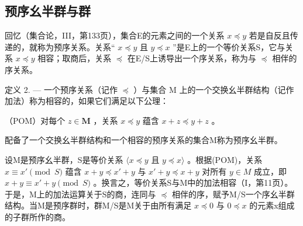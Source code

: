 \subsection{预序幺半群与群}

回忆（集合论，III，第133页），集合E的元素之间的一个关系 \(x \preccurlyeq y\) 若是自反且传递的，就称为预序关系。关系“ \(x \preccurlyeq y\) 且 \(y \preccurlyeq x\) ”是E上的一个等价关系S，它与关系 \(x \preccurlyeq y\) 相容；取商后，关系 \(\preccurlyeq\) 在E/S上诱导出一个序关系，称为与 \(\preccurlyeq\) 相伴的序关系。

定义 2. --- 一个预序关系（记作 \(\preccurlyeq\) ）与集合 M 上的一个交换幺半群结构（记作加法）称为相容的，如果它们满足以下公理：

（POM）对每个 \(z \in \mathbf{M}\) ，关系 \(x \preccurlyeq y\) 蕴含 \(x + z \preccurlyeq y + z\) 。

配备了一个交换幺半群结构和一个相容的预序关系的集合M称为预序幺半群。

设M是预序幺半群，S是等价关系 \(\langle x \preccurlyeq y\) 且 \(y \preccurlyeq x \rangle\) 。根据(POM)，关系 \(x \equiv x' \pmod{S}\) 蕴含 \(x + y \preccurlyeq x' + y\) 与 \(x' + y \preccurlyeq x + y\) 对所有 \(y \in M\) 成立，即 \(x + y \equiv x' + y \pmod{S}\) 。换言之，等价关系S与M中的加法相容（I，第11页）。于是，M上的加法运算关于S的商，连同与 \(\preccurlyeq\) 相伴的序，赋予M/S一个序幺半群结构。当M是预序群时，群M/S是M关于由所有满足 \(x \preccurlyeq 0\) 与 \(0 \preccurlyeq x\) 的元素x组成的子群所作的商。

